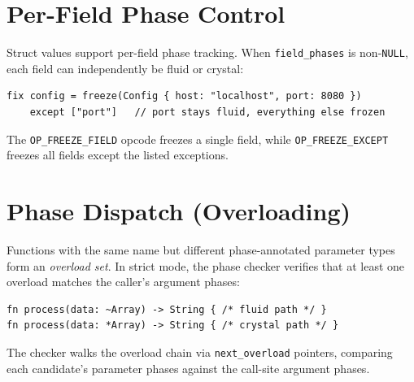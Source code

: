 \section{Per-Field Phase Control}

Struct values support per-field phase tracking. When
\texttt{field\_phases} is non-\texttt{NULL}, each field can independently
be fluid or crystal:

\begin{lstlisting}[language=Lattice]
fix config = freeze(Config { host: "localhost", port: 8080 })
    except ["port"]   // port stays fluid, everything else frozen
\end{lstlisting}

The \texttt{OP\_FREEZE\_FIELD} opcode freezes a single field, while
\texttt{OP\_FREEZE\_EXCEPT} freezes all fields except the listed exceptions.

\section{Phase Dispatch (Overloading)}

Functions with the same name but different phase-annotated parameter types
form an \emph{overload set}. In strict mode, the phase checker verifies
that at least one overload matches the caller's argument phases:

\begin{lstlisting}[language=Lattice]
fn process(data: ~Array) -> String { /* fluid path */ }
fn process(data: *Array) -> String { /* crystal path */ }
\end{lstlisting}

The checker walks the overload chain via \texttt{next\_overload} pointers,
comparing each candidate's parameter phases against the call-site argument
phases.
